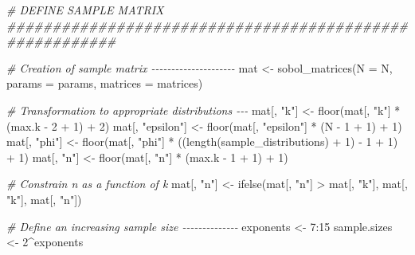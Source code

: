 \documentclass[
  11pt,
]{article}
\newenvironment{Shaded}{\begin{snugshade}}{\end{snugshade}}
\newcommand{\AttributeTok}[1]{\textcolor[rgb]{0.77,0.63,0.00}{#1}}
\newcommand{\CommentTok}[1]{\textcolor[rgb]{0.56,0.35,0.01}{\textit{#1}}}
\newcommand{\DecValTok}[1]{\textcolor[rgb]{0.00,0.00,0.81}{#1}}
\newcommand{\FunctionTok}[1]{\textcolor[rgb]{0.00,0.00,0.00}{#1}}
\newcommand{\NormalTok}[1]{#1}
\newcommand{\OtherTok}[1]{\textcolor[rgb]{0.56,0.35,0.01}{#1}}
\newcommand{\SpecialCharTok}[1]{\textcolor[rgb]{0.00,0.00,0.00}{#1}}
\newcommand{\StringTok}[1]{\textcolor[rgb]{0.31,0.60,0.02}{#1}}
\begin{document}
\begin{Shaded}
\begin{Highlighting}[]
\CommentTok{\# DEFINE SAMPLE MATRIX \#\#\#\#\#\#\#\#\#\#\#\#\#\#\#\#\#\#\#\#\#\#\#\#\#\#\#\#\#\#\#\#\#\#\#\#\#\#\#\#\#\#\#\#\#\#\#\#\#\#\#\#\#\#\#\#}

\CommentTok{\# Creation of sample matrix {-}{-}{-}{-}{-}{-}{-}{-}{-}{-}{-}{-}{-}{-}{-}{-}{-}{-}{-}{-}{-}}
\NormalTok{mat }\OtherTok{\textless{}{-}} \FunctionTok{sobol\_matrices}\NormalTok{(}\AttributeTok{N =}\NormalTok{ N, }\AttributeTok{params =}\NormalTok{ params, }\AttributeTok{matrices =}\NormalTok{ matrices)}

\CommentTok{\# Transformation to appropriate distributions {-}{-}{-}}
\NormalTok{mat[, }\StringTok{"k"}\NormalTok{] }\OtherTok{\textless{}{-}} \FunctionTok{floor}\NormalTok{(mat[, }\StringTok{"k"}\NormalTok{] }\SpecialCharTok{*}\NormalTok{ (max.k }\SpecialCharTok{{-}} \DecValTok{2} \SpecialCharTok{+} \DecValTok{1}\NormalTok{) }\SpecialCharTok{+} \DecValTok{2}\NormalTok{)}
\NormalTok{mat[, }\StringTok{"epsilon"}\NormalTok{] }\OtherTok{\textless{}{-}} \FunctionTok{floor}\NormalTok{(mat[, }\StringTok{"epsilon"}\NormalTok{] }\SpecialCharTok{*}\NormalTok{ (N }\SpecialCharTok{{-}} \DecValTok{1} \SpecialCharTok{+} \DecValTok{1}\NormalTok{) }\SpecialCharTok{+} \DecValTok{1}\NormalTok{)}
\NormalTok{mat[, }\StringTok{"phi"}\NormalTok{] }\OtherTok{\textless{}{-}} \FunctionTok{floor}\NormalTok{(mat[, }\StringTok{"phi"}\NormalTok{] }\SpecialCharTok{*}\NormalTok{ ((}\FunctionTok{length}\NormalTok{(sample\_distributions) }\SpecialCharTok{+} \DecValTok{1}\NormalTok{) }\SpecialCharTok{{-}} \DecValTok{1} \SpecialCharTok{+} \DecValTok{1}\NormalTok{) }\SpecialCharTok{+} \DecValTok{1}\NormalTok{)}
\NormalTok{mat[, }\StringTok{"n"}\NormalTok{] }\OtherTok{\textless{}{-}} \FunctionTok{floor}\NormalTok{(mat[, }\StringTok{"n"}\NormalTok{] }\SpecialCharTok{*}\NormalTok{ (max.k }\SpecialCharTok{{-}} \DecValTok{1} \SpecialCharTok{+} \DecValTok{1}\NormalTok{) }\SpecialCharTok{+} \DecValTok{1}\NormalTok{)}

\CommentTok{\# Constrain n as a function of k}
\NormalTok{mat[, }\StringTok{"n"}\NormalTok{] }\OtherTok{\textless{}{-}} \FunctionTok{ifelse}\NormalTok{(mat[, }\StringTok{"n"}\NormalTok{] }\SpecialCharTok{\textgreater{}}\NormalTok{ mat[, }\StringTok{"k"}\NormalTok{], mat[, }\StringTok{"k"}\NormalTok{], mat[, }\StringTok{"n"}\NormalTok{])}

\CommentTok{\# Define an increasing sample size {-}{-}{-}{-}{-}{-}{-}{-}{-}{-}{-}{-}{-}{-}}
\NormalTok{exponents }\OtherTok{\textless{}{-}} \DecValTok{7}\SpecialCharTok{:}\DecValTok{15}
\NormalTok{sample.sizes }\OtherTok{\textless{}{-}} \DecValTok{2}\SpecialCharTok{\^{}}\NormalTok{exponents}


\end{Highlighting}
\end{Shaded}
\end{document}
